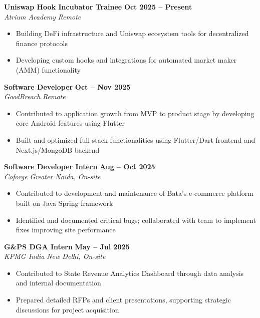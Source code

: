 \documentclass[11pt,a4paper]{article}
\begin{document}
\noindent \textbf{Uniswap Hook Incubator Trainee} \hfill \textbf{Oct 2025 -- Present} \\
\textit{Atrium Academy} \hfill \textit{Remote}
\begin{itemize}[leftmargin=1.5em, itemsep=1pt, parsep=0pt, topsep=1.5pt]
  \item Building DeFi infrastructure and Uniswap ecosystem tools for decentralized finance protocols
  \item Developing custom hooks and integrations for automated market maker (AMM) functionality
\end{itemize}

\newpage
\noindent \textbf{Software Developer} \hfill \textbf{Oct -- Nov 2025} \\
\textit{GoodBreach} \hfill \textit{Remote}
\begin{itemize}[leftmargin=1.5em, itemsep=1pt, parsep=0pt, topsep=1.5pt]
  \item Contributed to application growth from MVP to product stage by developing core Android features using Flutter
  \item Built and optimized full-stack functionalities using Flutter/Dart frontend and Next.js/MongoDB backend
\end{itemize}
\vspace{2.5pt}

\noindent \textbf{Software Developer Intern} \hfill \textbf{Aug -- Oct 2025} \\
\textit{Coforge} \hfill \textit{Greater Noida, On-site}
\begin{itemize}[leftmargin=1.5em, itemsep=1pt, parsep=0pt, topsep=1.5pt]
  \item Contributed to development and maintenance of Bata's e-commerce platform built on Java Spring framework
  \item Identified and documented critical bugs; collaborated with team to implement fixes improving site performance
\end{itemize}
\vspace{2.5pt}

\noindent \textbf{G\&PS DGA Intern} \hfill \textbf{May -- Jul 2025} \\
\textit{KPMG India} \hfill \textit{New Delhi, On-site}
\begin{itemize}[leftmargin=1.5em, itemsep=1pt, parsep=0pt, topsep=1.5pt]
  \item Contributed to State Revenue Analytics Dashboard through data analysis and internal documentation
  \item Prepared detailed RFPs and client presentations, supporting strategic discussions for project acquisition
\end{itemize}
\vspace{2.5pt}
\end{document}

